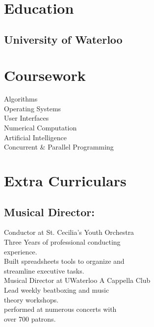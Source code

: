 \documentclass[letterpaper]{kevin-resume} %
\begin{document}
{\begin{minipage}[t]{0.30\textwidth}
\section{Education} 

\subsection{University of Waterloo}


\sectionspace %


\section{Coursework}

Algorithms \\
Operating Systems \\
User Interfaces \\
Numerical Computation \\
Artificial Intelligence \\
Concurrent \& Parallel Programming

\sectionspace %



\section{Extra Curriculars}
\subsection{Musical Director:}
{Conductor at St. Cecilia’s Youth Orchestra}\\
	\textbullet{} Three Years of professional conducting\\
	\hspace{3mm}experience.\\
	\textbullet{} Built spreadsheets tools to organize and\\
	\hspace{3mm}streamline executive tasks.\\
{Musical Director at UWaterloo A Cappella Club}\\
	\textbullet{} Lead weekly beatboxing and music\\
	\hspace{3mm}theory workshops.\\
	\textbullet{} performed at numerous concerts with\\
	\hspace{3mm}over 700 patrons.


\end{minipage}}
\end{document}
